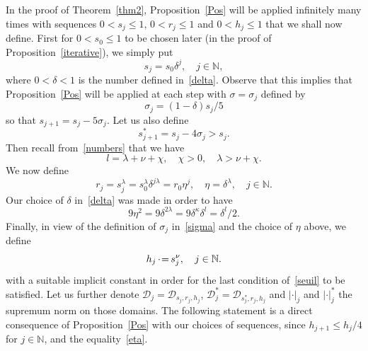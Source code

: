 \documentclass[JEP,XML,SOM,Unicode]{cedram}
\let\mathcal\mathscr
\numberwithin{equation}{section}
\theoremstyle{plain}
\theoremstyle{definition}
\newcommand{\N}{\mathbb{N}}
\newcommand\PE{\,{\cdot\hspace{-.2em}=}\,}
\begin{document}
In the proof of Theorem~\ref{thm2}, Proposition~\ref{Pos} will be applied infinitely many times with sequences $0 < s_j \leq 1$, $0 <r_j \leq 1$ and $0 < h_j \leq 1$ that we shall now define. First for $0<s_0\leq 1$ to be chosen later (in the proof of Proposition~\ref{iterative}), we simply put
\begin{equation}\label{sj}
s_j=s_0\delta^{j}, \quad j \in \N,
\end{equation}
where $0<\delta<1$ is the number defined in~\eqref{delta}. Observe that this implies that Proposition~\ref{Pos} will be applied at each step with $\sigma=\sigma_j$ defined by
\begin{equation}\label{sigma}
\sigma_j=(1-\delta)s_j/5
\end{equation}
so that $s_{j+1}=s_j-5\sigma_j$. Let us also define
\begin{equation}\label{sj+}
s_{j+1}^*=s_j-4\sigma_j>s_j.
\end{equation}
Then recall from~\eqref{numbers} that we have
\[ l=\lambda+\nu+\chi, \quad \chi>0, \quad \lambda>\nu+\chi. \]
We now define
\begin{equation}\label{rj}
r_j=s_j^\lambda=s_0^\lambda\delta^{j \lambda}=r_0\eta^{j}, \quad \eta=\delta^{\lambda}, \quad j \in \N.
\end{equation}
Our choice of $\delta$ in~\eqref{delta} was made in order to have
\begin{equation}\label{eta}
9\eta^2=9\delta^{2\lambda}=9\delta^{\kappa}\delta^l=\delta^l/2.
\end{equation}
Finally, in view of the definition of $\sigma_j$ in~\eqref{sigma} and the choice of $\eta$ above, we define
\begin{equation}\label{hj}
h_j\PE s_j^\nu, \quad j \in \N.
\end{equation}
with a suitable implicit constant in order for the last condition of~\eqref{seuil} to be satisfied. Let us further denote $\mathcal{D}_j=\mathcal{D}_{s_j,r_j,h_j}$, $\mathcal{D}_j^*=\mathcal{D}_{s_j^*,r_j,h_j}$ and $|{\cdot}|_j$ and $|{\cdot}|_j^*$ the supremum norm on those domains. The following statement is a direct consequence of Proposition~\ref{Pos} with our choices of sequences, since $h_{j+1}\leq h_j/4$ for $j \in \N$, and the equality~\eqref{eta}.
\end{document}
